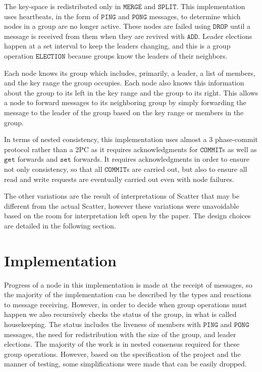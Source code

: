\documentclass{amsart}
\theoremstyle{definition}
\theoremstyle{remark}
\numberwithin{equation}{section}
\begin{document}
The key-space is redistributed only in $\mathtt{MERGE}$ and $\mathtt{SPLIT}$. This implementation uses heartbeats, in the form of $\mathtt{PING}$ and $\mathtt{PONG}$ messages, to determine which nodes in a group are no longer active. These nodes are failed using $\mathtt{DROP}$ until a message is received from them when they are revived with $\mathtt{ADD}$. Leader elections happen at a set interval to keep the leaders changing, and this is a group operation $\mathtt{ELECTION}$ because groups know the leaders of their neighbors.

Each node knows its group which includes, primarily, a leader, a list of members, and the key range the group occupies. Each node also knows this information about the group to its left in the key range and the group to its right. This allows a node to forward messages to its neighboring group by simply forwarding the message to the leader of the group based on the key range or members in the group. 

In terms of nested consistency, this implementation uses almost a $3$ phase-commit protocol rather than a 2PC as it requires acknowledgments for $\mathtt{COMMIT}$s as well as $\mathtt{get}$ forwards and $\mathtt{set}$ forwards. It requires acknowledgments in order to ensure not only consistency, so that all $\mathtt{COMMIT}$s are carried out, but also to ensure all read and write requests are eventually carried out even with node failures. 

The other variations are the result of interpretations of Scatter that may be different from the actual Scatter, however these variations were unavoidable based on the room for interpretation left open by the paper. The design choices are detailed in the following section.
\section{Implementation}
Progress of a node in this implementation is made at the receipt of messages, so the majority of the implementation can be described by the types and reactions to message receiving. However, in order to decide when group operations must happen we also recursively checks the status of the group, in what is called housekeeping. The status includes the liveness of members with $\mathtt{PING}$ and $\mathtt{PONG}$ messages, the need for redistribution with the size of the group, and leader elections. The majority of the work is in nested consensus required for these group operations. However, based on the specification of the project and the manner of testing, some simplifications were made that can be easily dropped. 
\end{document}
